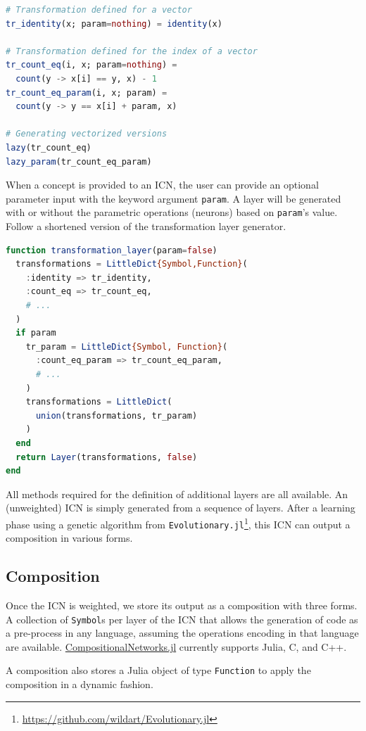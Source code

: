 \documentclass{juliacon}
\newcommand{\cnjl}{\href{https://github.com/JuliaConstraints/CompositionalNetworks.jl}{CompositionalNetworks.jl}\xspace}
\begin{document}
\begin{lstlisting}[language = Julia]
# Transformation defined for a vector
tr_identity(x; param=nothing) = identity(x)

# Transformation defined for the index of a vector
tr_count_eq(i, x; param=nothing) =
  count(y -> x[i] == y, x) - 1
tr_count_eq_param(i, x; param) =
  count(y -> y == x[i] + param, x)

# Generating vectorized versions
lazy(tr_count_eq)
lazy_param(tr_count_eq_param)
\end{lstlisting}

When a concept is provided to an ICN, the user can provide an optional parameter input with the keyword argument \texttt{param}. A layer will be generated with or without the parametric operations (neurons) based on \texttt{param}'s value. Follow a shortened version of the transformation layer generator.

\begin{lstlisting}[language = Julia]
function transformation_layer(param=false)
  transformations = LittleDict{Symbol,Function}(
    :identity => tr_identity,
    :count_eq => tr_count_eq,
    # ...
  )
  if param
    tr_param = LittleDict{Symbol, Function}(
      :count_eq_param => tr_count_eq_param,
      # ...
    )
    transformations = LittleDict(
      union(transformations, tr_param)
    )
  end
  return Layer(transformations, false)
end
\end{lstlisting}

All methods required for the definition of additional layers are all available. An (unweighted) ICN is simply generated from a sequence of layers. After a learning phase using a genetic algorithm from \texttt{Evolutionary.jl}\footnote{\url{https://github.com/wildart/Evolutionary.jl}}, this ICN can output a composition in various forms.

\subsection{Composition}
\label{subsec:composition}

Once the ICN is weighted, we store its  output as a composition with three forms.
A collection of \texttt{Symbol}s per layer of the ICN that allows the generation of code as a pre-process in any language, assuming the operations encoding in that language are available. \cnjl currently supports Julia, C, and C++.

A composition also stores a Julia object of type \texttt{Function} to apply the composition in a dynamic fashion.
\end{document}
